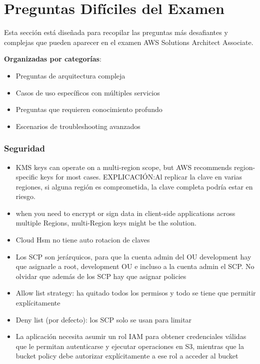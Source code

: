 \documentclass[12pt,a4paper]{report}
\begin{document}
\chapter{Preguntas Difíciles del Examen}

\begin{conceptbox}
Esta sección está diseñada para recopilar las preguntas más desafiantes y complejas que pueden aparecer en el examen AWS Solutions Architect Associate.

\textbf{Organizadas por categorías}:
\begin{itemize}
    \item Preguntas de arquitectura compleja
    \item Casos de uso específicos con múltiples servicios
    \item Preguntas que requieren conocimiento profundo
    \item Escenarios de troubleshooting avanzados
\end{itemize}
\end{conceptbox}



\subsection{Seguridad}

\begin{itemize}
    \item KMS keys can operate on a multi-region scope, but AWS recommends region-specific keys for most cases. EXPLICACIÓN:Al replicar la clave en varias regiones, si alguna región es comprometida, la clave completa podría estar en riesgo.
    \item when you need to encrypt or sign data in client-side applications across multiple Regions, multi-Region keys might be the solution.
    \item Cloud Hsm no tiene auto rotacion de claves
    \item Los SCP son jerárquicos, para que la cuenta admin del OU development hay que asignarle a root, development OU e incluso a la cuenta admin el SCP. No olvidar que además de los SCP hay que asignar policies
    \item Allow list strategy: ha quitado todos los permisos y todo se tiene que permitir explícitamente
    \item Deny list (por defecto): los SCP solo se usan para limitar
    \item La aplicación necesita asumir un rol IAM para obtener credenciales válidas que le permitan autenticarse y ejecutar operaciones en S3, mientras que la bucket policy debe autorizar explícitamente a ese rol a acceder al bucket
\end{itemize}
\end{document}
